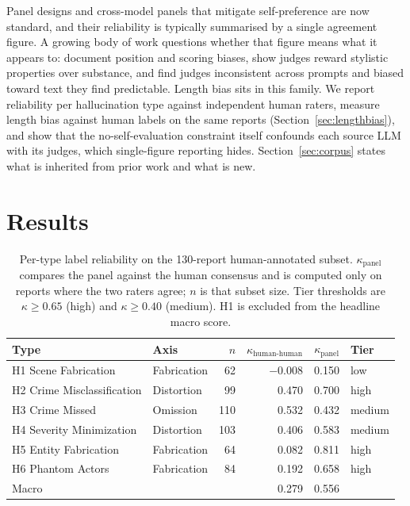 \documentclass{article}
\begin{document}
Panel designs \citep{zheng2023judging} and cross-model panels that mitigate
self-preference \citep{panickssery2024llm} are now standard, and their
reliability is typically summarised by a single agreement figure. A growing
body of work questions whether that figure means what it appears to:
\citet{wang2024fair} document position and scoring biases,
\citet{wu2023style} show judges reward stylistic properties over substance,
and \citet{stureborg2024inconsistent} find judges inconsistent across prompts
and biased toward text they find predictable. Length bias sits in this family.
We report reliability per hallucination type against independent human raters,
measure length bias against human labels on the same reports
(Section~\ref{sec:lengthbias}), and show that the no-self-evaluation constraint
itself confounds each source LLM with its judges, which single-figure reporting
hides. Section~\ref{sec:corpus} states what is inherited from prior work and
what is new.



\section{Results}
\label{sec:results}


\begin{table}[!b]
\caption{Per-type label reliability on the 130-report human-annotated subset.
$\kappa_{\text{panel}}$ compares the panel against the human consensus and is
computed only on reports where the two raters agree; $n$ is that subset size.
Tier thresholds are $\kappa \geq 0.65$ (high) and $\kappa \geq 0.40$ (medium).
H1 is excluded from the headline macro score.}
\label{tab:reliability}
\centering\small
\begin{tabular}{llrrrl}
\toprule
Type & Axis & $n$ & $\kappa_{\text{human-human}}$ & $\kappa_{\text{panel}}$ & Tier \\
\midrule
H1 Scene Fabrication       & Fabrication & 62  & $-0.008$ & 0.150 & low \\
H2 Crime Misclassification & Distortion  & 99  & 0.470 & 0.700 & high \\
H3 Crime Missed            & Omission    & 110 & 0.532 & 0.432 & medium \\
H4 Severity Minimization   & Distortion  & 103 & 0.406 & 0.583 & medium \\
H5 Entity Fabrication      & Fabrication & 64  & 0.082 & 0.811 & high \\
H6 Phantom Actors          & Fabrication & 84  & 0.192 & 0.658 & high \\
\midrule
Macro & & & 0.279 & 0.556 & \\
\bottomrule
\end{tabular}
\end{table}
\end{document}

